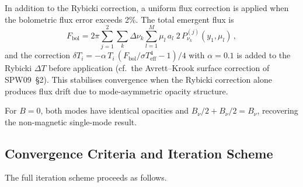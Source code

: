 In addition to the Rybicki correction, a uniform flux correction is applied when the bolometric flux error exceeds 2\%. The total emergent flux is
\begin{equation}
  F_\mathrm{bol} = 2\pi\sum_{j=1}^{2}\sum_{k}\Delta\nu_k
    \sum_{l=1}^{M} \mu_l\,a_l\;2\,P^{(j)}_{\nu_k}(y_1,\mu_l)\,,
  \label{eq:Fbol_2mode}
\end{equation}
and the correction $\delta T_i = -\alpha\,T_i\,(F_\mathrm{bol}/\sigma T_\mathrm{eff}^4 - 1)/4$ with $\alpha=0.1$ is added to the Rybicki $\Delta T$ before application (cf.\ the Avrett--Krook surface correction of SPW09~\S2). This stabilises convergence when the Rybicki correction alone produces flux drift due to mode-asymmetric opacity structure.

For $B=0$, both modes have identical opacities and $B_\nu/2+B_\nu/2 = B_\nu$, recovering the non-magnetic single-mode result.

\subsection{Convergence Criteria and Iteration Scheme}
\label{sec:convergence}

The full iteration scheme proceeds as follows.

